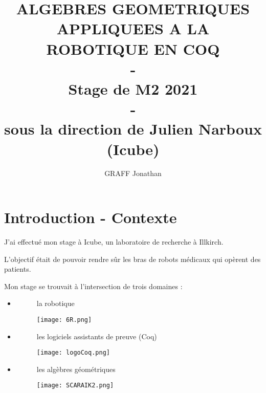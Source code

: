 \documentclass{beamer}
\title{ALGEBRES GEOMETRIQUES APPLIQUEES A LA ROBOTIQUE EN COQ \\-\\Stage de M2 2021 \\-\\ sous la direction de Julien Narboux (Icube)}
\author{GRAFF Jonathan}
\date{}
\begin{document}
\maketitle
\section{Introduction - Contexte } 
\begin{frame}
J'ai effectué mon stage à Icube, un laboratoire de recherche à Illkirch. \pause

L'objectif était de pouvoir rendre sûr les bras de robots médicaux qui opèrent des patients. \pause

Mon stage se trouvait à l'intersection de trois domaines : \begin{itemize}
 \pause \item  \begin{figure}[!ht]
    la robotique \begin{minipage}[c]{.3\linewidth}
        \centering
        \texttt{[image: 6R.png]}
    \end{minipage}
\end{figure}

 \pause \item \begin{figure}[!ht] les logiciels assistants de preuve (Coq) \begin{minipage}[c]{.3\linewidth}
        \centering
        \texttt{[image: logoCoq.png]}
    \end{minipage}
\end{figure}

\pause \item \begin{figure}[!ht] les algèbres géométriques \begin{minipage}[c]{.3\linewidth}
        \centering
        \texttt{[image: SCARAIK2.png]}
    \end{minipage}
\end{figure}

\end{itemize}

\end{frame}
\end{document}
